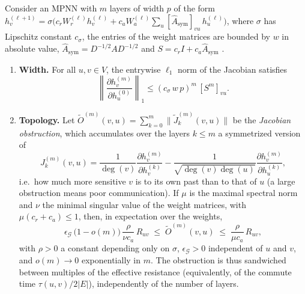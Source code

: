 \begin{theorem}\label{thm:oversquashing_resistencia}
	Consider an \gls{MPNN} with $m$ layers of width $p$ of the form $h_v^{(\ell+1)} = \sigma\bigl(c_r W_r^{(\ell)} h_v^{(\ell)} + c_a W_a^{(\ell)} \sum_{u} [\hat{A}_{\mathrm{sym}}]_{vu}\, h_u^{(\ell)}\bigr)$, where $\sigma$ has Lipschitz constant $c_\sigma$, the entries of the weight matrices are bounded by $w$ in absolute value, $\hat{A}_{\mathrm{sym}} = D^{-1/2} A D^{-1/2}$ and $S = c_r I + c_a \hat{A}_{\mathrm{sym}}$ \citep{digiovanni2023oversquashing}.
	\begin{enumerate}
		\item \textbf{Width.} For all $u, v \in V$, the entrywise $\ell_1$ norm of the Jacobian satisfies
		\[
			\left\|\frac{\partial h_v^{(m)}}{\partial h_u^{(0)}}\right\|_1 \leq (c_\sigma\, w\, p)^m\, [S^m]_{vu}.
		\]
		\item \textbf{Topology.} Let $\tilde{O}^{(m)}(v,u) = \sum_{k=0}^{m}\|\tilde{J}^{(m)}_k(v,u)\|$ be the \textit{Jacobian obstruction}, which accumulates over the layers $k \leq m$ a symmetrized version of
		\[
			J^{(m)}_k(v,u) = \frac{1}{\deg(v)}\frac{\partial h_v^{(m)}}{\partial h_v^{(k)}} - \frac{1}{\sqrt{\deg(v)\deg(u)}}\frac{\partial h_v^{(m)}}{\partial h_u^{(k)}},
		\]
		i.e.\ how much more sensitive $v$ is to its own past than to that of $u$ (a large obstruction means poor communication). If $\mu$ is the maximal spectral norm and $\nu$ the minimal singular value of the weight matrices, with $\mu(c_r + c_a) \leq 1$, then, in expectation over the weights,
		\[
			\epsilon_{\mathcal{G}}\,\bigl(1 - o(m)\bigr)\,\frac{\rho}{\nu c_a}\, R_{uv} \;\leq\; \tilde{O}^{(m)}(v,u) \;\leq\; \frac{\rho}{\mu c_a}\, R_{uv},
		\]
		with $\rho > 0$ a constant depending only on $\sigma$, $\epsilon_{\mathcal{G}} > 0$ independent of $u$ and $v$, and $o(m) \to 0$ exponentially in $m$. The obstruction is thus sandwiched between multiples of the effective resistance (equivalently, of the commute time $\tau(u,v)/2|E|$), independently of the number of layers.
	\end{enumerate}
\end{theorem}


